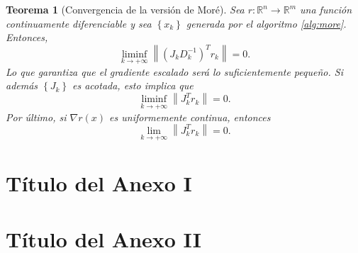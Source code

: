 \documentclass[11pt,a4paper]{book}
\newtheorem{theorem}{Teorema}[chapter]
\theoremstyle{definition}
\theoremstyle{remark}
\newcommand{\norm}[1]{\left\lVert#1\right\rVert}
\newcommand{\sucesionxk}{\left\{x_k\right\}}
\newcommand{\sucesion}[1]{\left\{#1\right\}}
\begin{document}
\begin{theorem}[Convergencia de la versión de Moré]\label{th:more}
	Sea $r:\mathbb{R}^n \to \mathbb{R}^m$ una función continuamente diferenciable y
	sea $\sucesionxk$ generada por el algoritmo \ref{alg:more}. Entonces,
	\begin{equation}
		\liminf_{k\to +\infty} \norm{(J_kD_k^{-1})^Tr_k} = 0.
	\end{equation}
	Lo que garantiza que el gradiente escalado será lo suficientemente pequeño.
	Si además $\sucesion{J_k}$ es acotada, esto implica que
	\begin{equation}
		\liminf_{k\to +\infty} \norm{J_k^Tr_k} = 0.
	\end{equation}
	Por último, si $\nabla r(x)$ es uniformemente continua, entonces
	\begin{equation}
		\lim_{k\to +\infty} \norm{J_k^Tr_k} = 0.
	\end{equation}
\end{theorem}

\appendix
\renewcommand{\thechapter}{\Roman{chapter}}
\chapter{Título del Anexo I}


\chapter{Título del Anexo II}

\backmatter


%


\nocite{*}


\end{document}

